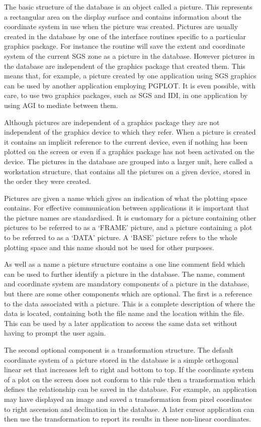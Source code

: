 \documentclass[twoside,11pt,nolof]{starlink}
\begin{document}
The basic structure of the database is an object called a picture. This
represents a rectangular area on the display surface and contains
information about the coordinate system in use when the picture was
created. Pictures are usually created in the database by one of the
interface routines specific to a particular graphics package. For
instance the routine
 will save the extent and coordinate
system of the current SGS zone as a picture in the database. However
pictures in the database are independent of the graphics package that
created them. This means that, for example, a picture created by one
application using SGS graphics can be used by another application
employing PGPLOT. It is even possible, with care, to use two graphics
packages, such as SGS and IDI, in one application by using AGI to
mediate between them.

Although pictures are independent of a graphics package they are not
independent of the graphics device to which they refer. When a picture
is created it contains an implicit reference to the current device,
even if nothing has been plotted on the screen or even if a graphics
package has not been activated on the device.
The pictures in the database are grouped into a larger unit, here called
a workstation structure, that contains all the pictures on a given device,
stored in the order they were created.

Pictures are given a name which gives an indication of what the plotting
space contains. For effective communication between applications it is
important that the picture names are standardised. It is customary for
a picture containing other pictures to be referred to as a `FRAME' picture,
and a picture containing a plot to be referred to as a `DATA' picture.
A `BASE' picture refers to the whole plotting space and this name should
not be used for other purposes.

As well as a name a picture structure contains a one line comment field
which can be used to further identify a picture in the database. The name,
comment and coordinate system are mandatory components of a picture in
the database, but there are some other components which are optional.
The first is a reference to the data associated with a picture. This
is a complete description of where the data is located, containing both
the file name and the location within the file. This can be used by a
later application to access the same data set without having to prompt
the user again.

The second optional component is a transformation structure.
The default coordinate system of a picture stored in the database is a
simple orthogonal linear set that increases left to right and bottom to top.
If the coordinate system of a plot on the screen does not conform to this
rule then a transformation which defines the relationship can
be saved in the database.
For example, an application may have displayed an image and saved a
transformation from pixel coordinates to right ascension and declination
in the database. A later cursor application can then use the transformation
to report its results in these non-linear coordinates.
\end{document}
